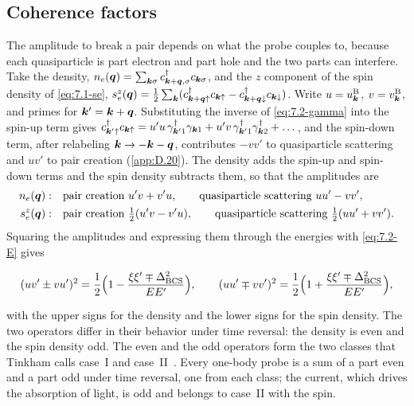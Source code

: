 \subsection{Coherence factors}

The amplitude to break a pair depends on what the probe couples to, because each quasiparticle is part electron and part hole and the two parts can interfere. Take the density, $n_e(\bm{q}) = \sum_{\bm{k}\sigma}c^\dagger_{\bm{k}+\bm{q},\sigma}c_{\bm{k}\sigma}$, and the $z$ component of the spin density of \cref{eq:7.1-se}, $s^z_e(\bm{q}) = \frac12\sum_{\bm{k}}(c^\dagger_{\bm{k}+\bm{q}\uparrow}c_{\bm{k}\uparrow} - c^\dagger_{\bm{k}+\bm{q}\downarrow}c_{\bm{k}\downarrow})$. Write $u = u^{\mathrm{B}}_{\bm{k}}$, $v = v^{\mathrm{B}}_{\bm{k}}$, and primes for $\bm{k}' = \bm{k} + \bm{q}$. Substituting the inverse of \cref{eq:7.2-gamma} into the spin-up term gives $c^\dagger_{\bm{k}'\uparrow}c_{\bm{k}\uparrow} = u'u\,\gamma^\dagger_{\bm{k}'1}\gamma_{\bm{k}1} + u'v\,\gamma^\dagger_{\bm{k}'1}\gamma^\dagger_{\bm{k}2} + \dots$, and the spin-down term, after relabeling $\bm{k} \to -\bm{k} - \bm{q}$, contributes $-vv'$ to quasiparticle scattering and $uv'$ to pair creation (\cref{app:D.20}). The density adds the spin-up and spin-down terms and the spin density subtracts them, so that the amplitudes are
\begin{equation}
  \begin{aligned}
  n_e(\bm{q}):&\quad \text{pair creation } u'v + v'u, \qquad \text{quasiparticle scattering } uu' - vv' ,\\
  s^z_e(\bm{q}):&\quad \text{pair creation } \tfrac12(u'v - v'u), \qquad \text{quasiparticle scattering } \tfrac12(uu' + vv') .
  \end{aligned}
  \label{eq:7.2-coh}
\end{equation}
Squaring the amplitudes and expressing them through the energies with \cref{eq:7.2-E} gives
\begin{keyresult}
\begin{equation}
  (uv' \pm vu')^2 = \frac12\Bigl(1 - \frac{\xi\xi' \mp \Delta_{\mathrm{BCS}}^2}{EE'}\Bigr), \qquad
  (uu' \mp vv')^2 = \frac12\Bigl(1 + \frac{\xi\xi' \mp \Delta_{\mathrm{BCS}}^2}{EE'}\Bigr) ,
  \label{eq:7.2-cohE}
\end{equation}
\end{keyresult}
with the upper signs for the density and the lower signs for the spin density. The two operators differ in their behavior under time reversal: the density is even and the spin density odd. The even and the odd operators form the two classes that Tinkham calls case~I and case~II~\cite{tinkham2004introduction}. Every one-body probe is a sum of a part even and a part odd under time reversal, one from each class; the current, which drives the absorption of light, is odd and belongs to case~II with the spin.

